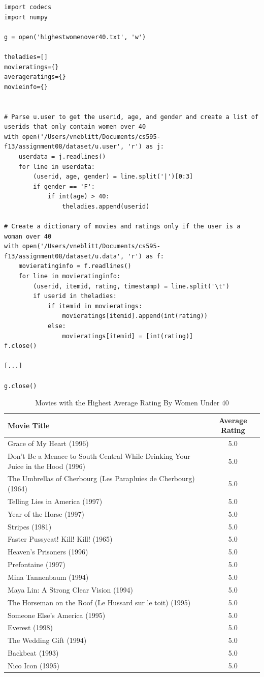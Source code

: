 \documentclass{article}
\begin{document}
\begin{lstlisting}[frame=single, caption=highestwomenover40.py, label=highestwomenover40]
import codecs
import numpy

g = open('highestwomenover40.txt', 'w')

theladies=[]
movieratings={}
averageratings={}
movieinfo={}


# Parse u.user to get the userid, age, and gender and create a list of userids that only contain women over 40
with open('/Users/vneblitt/Documents/cs595-f13/assignment08/dataset/u.user', 'r') as j:
	userdata = j.readlines()
	for line in userdata:
		(userid, age, gender) = line.split('|')[0:3]
		if gender == 'F':
			if int(age) > 40:
				theladies.append(userid)

# Create a dictionary of movies and ratings only if the user is a woman over 40
with open('/Users/vneblitt/Documents/cs595-f13/assignment08/dataset/u.data', 'r') as f:
	movieratinginfo = f.readlines()
	for line in movieratinginfo:
		(userid, itemid, rating, timestamp) = line.split('\t')
		if userid in theladies:
			if itemid in movieratings:
				movieratings[itemid].append(int(rating))
			else:
				movieratings[itemid] = [int(rating)]
f.close()

[...]

g.close()
\end{lstlisting}

\begin{table}[!h]
\centering
\begin{tabular}{l c}
Movie Title & Average Rating \\
\hline
Grace of My Heart (1996) & 5.0 \\
Don't Be a Menace to South Central While Drinking Your Juice in the Hood (1996) & 5.0 \\
The Umbrellas of Cherbourg (Les Parapluies de Cherbourg) (1964) & 5.0 \\
Telling Lies in America (1997) & 5.0 \\
Year of the Horse (1997) & 5.0 \\
Stripes (1981) & 5.0 \\
Faster Pussycat! Kill! Kill! (1965) & 5.0 \\
Heaven's Prisoners (1996) & 5.0 \\
Prefontaine (1997) & 5.0 \\
Mina Tannenbaum (1994) & 5.0 \\
Maya Lin: A Strong Clear Vision (1994) & 5.0 \\
The Horseman on the Roof (Le Hussard sur le toit) (1995) & 5.0 \\
Someone Else's America (1995) & 5.0 \\
Everest (1998) & 5.0 \\
The Wedding Gift (1994) & 5.0 \\
Backbeat (1993) & 5.0 \\
Nico Icon (1995) & 5.0 \\
\hline
\end{tabular}
\caption{Movies with the Highest Average Rating By Women Under 40}
\end{table}
\end{document}
